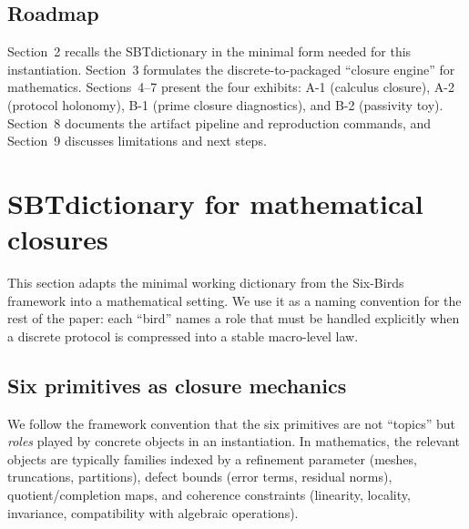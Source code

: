 \documentclass[apajournal,article,submit,moreauthors,pdftex]{Definitions/mdpi}
\newcommand{\SBT}{\textsc{SBT}}
\begin{document}
\subsection{Roadmap}
Section~2 recalls the \SBT dictionary in the minimal form needed for this instantiation.
Section~3 formulates the discrete-to-packaged ``closure engine'' for mathematics.
Sections~4--7 present the four exhibits: A-1 (calculus closure), A-2 (protocol holonomy), B-1 (prime closure diagnostics), and B-2 (passivity toy).
Section~8 documents the artifact pipeline and reproduction commands, and Section~9 discusses limitations and next steps.
 \section{\SBT dictionary for mathematical closures}
\label{sec:dictionary}

This section adapts the minimal working dictionary from the Six-Birds framework \cite{SixBirdsFramework} into a mathematical setting.
We use it as a naming convention for the rest of the paper: each ``bird'' names a role that must be handled explicitly when a discrete protocol is compressed into a stable macro-level law.

\subsection{Six primitives as closure mechanics}
We follow the framework convention that the six primitives are not ``topics'' but \emph{roles} played by concrete objects in an instantiation.
In mathematics, the relevant objects are typically families indexed by a refinement parameter (meshes, truncations, partitions), defect bounds (error terms, residual norms), quotient/completion maps, and coherence constraints (linearity, locality, invariance, compatibility with algebraic operations).
\end{document}
